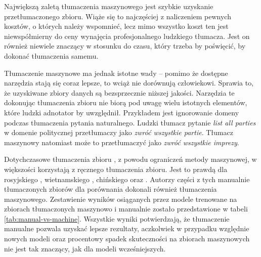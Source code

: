 Największą zaletą tłumaczenia maszynowego jest szybkie uzyskanie przetłumaczonego zbioru. Wiąże się to najczęściej z naliczeniem pewnych kosztów, o których należy wspomnieć, lecz mimo wszystko koszt ten jest niewspółmierny do ceny wynajęcia profesjonalnego ludzkiego tłumacza. Jest on również niewiele znaczący w stosunku do czasu, który trzeba by poświęcić, by dokonać tłumaczenia samemu.

Tłumaczenie maszynowe ma jednak istotne wady -- pomimo że dostępne narzędzia stają się coraz lepsze, to wciąż nie dorównują człowiekowi. Sprawia to, że uzyskiwane zbiory danych są bezsprzecznie niższej jakości. Narzędzia te dokonując tłumaczenia zbioru  nie biorą pod uwagę wielu istotnych elementów, które ludzki adnotator by uwzględnił. Przykładem jest ignorowanie domeny podczas tłumaczenia pytania naturalnego. Ludzki tłumacz pytanie \textit{list all parties} w domenie politycznej przetłumaczy jako \textit{zwróć wszystkie partie}. Tłumacz maszynowy natomiast może to przetłumaczyć jako \textit{zwróć wszystkie imprezy}.

Dotychczasowe tłumaczenia zbioru , z powodu ograniczeń metody maszynowej, w większości korzystają z ręcznego tłumaczenia zbioru. Jest to prawdą dla rosyjskiego , wietnamskiego , chińskiego  oraz . Autorzy części z tych manualnie tłumaczonych zbiorów dla porównania dokonali również tłumaczenia maszynowego. Zestawienie wyników osiąganych przez modele trenowane na zbiorach tłumaczonych maszynowo i manualnie zostało przedstawione w tabeli \ref{tab:manual-vs-machine}. Wszystkie wyniki potwierdzają, że tłumaczenie manualne pozwala uzyskać lepsze rezultaty, aczkolwiek w przypadku względnie nowych modeli  oraz  procentowy spadek skuteczności na zbiorach maszynowych nie jest tak znaczący, jak dla modeli wcześniejszych.

